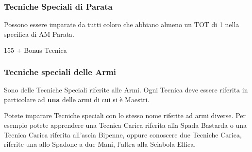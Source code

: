 \subsubsection{Tecniche Speciali di Parata}  Possono essere imparate da tutti coloro che abbiano almeno
un TOT di 1 nella specifica di AM Parata.

\begin{description}
   {1}{5}{5 + Bonus Tecnica}
\end{description}

\subsubsection{Tecniche speciali delle Armi} 
Sono delle Tecniche Speciali riferite alle Armi.  Ogni Tecnica deve
essere riferita in particolare ad \textbf{una} delle armi di cui si
\`e Maestri.

Potete imparare Tecniche speciali con lo stesso nome riferite ad armi
diverse. Per esempio potete apprendere una Tecnica Carica riferita
alla Spada Bastarda o una Tecnica Carica riferita all'ascia Bipenne,
oppure conoscere due Tecniche Carica, riferite una allo Spadone a due
Mani, l'altra alla Sciabola Elfica.

